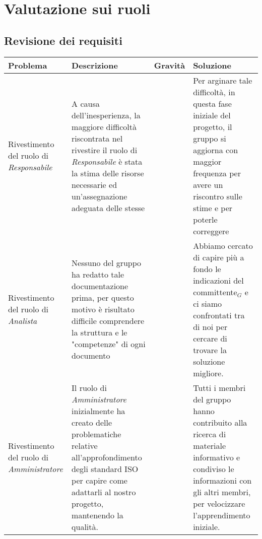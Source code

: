 {{\section{Valutazione sui ruoli}\label{ValutazionePerIlMiglioramentoValutazioneSuiRuoli}

\subsection{Revisione dei requisiti}\label{ValutazionePerIlMiglioramentoValutazioneSuiRuoliRevisioneDeiRequisiti}

\quad
\def\tabularxcolumn#1{m{#1}}
{

	\begin{center}
		\renewcommand{\arraystretch}{1.4}
		\begin{tabularx}{\textwidth}[c]{|p{}|p{5cm}|p{}|p{}|}
			\hline
			\rowcolor{airforceblue}
			\textbf{Problema} & \textbf{Descrizione} & \textbf{Gravità} & \textbf{Soluzione}\\
			\hline
			Rivestimento del ruolo di \textit{Responsabile} &A causa dell'inesperienza, la maggiore difficoltà riscontrata nel rivestire il ruolo di \textit{Responsabile} è stata la stima delle risorse necessarie ed un'assegnazione adeguata delle stesse & \centering2 & Per arginare tale difficoltà,  in questa fase iniziale del progetto, il gruppo si aggiorna con maggior frequenza per avere un riscontro sulle stime e per poterle correggere \\
			\hline
			Rivestimento del ruolo di \textit{Analista}& Nessuno del gruppo ha redatto tale documentazione prima, per questo motivo è risultato difficile comprendere la struttura e le "competenze" di ogni documento & \centering2 & Abbiamo cercato di capire più a fondo le indicazioni del committente$_G$ e ci siamo confrontati tra di noi per cercare di trovare la soluzione migliore. \\
			\hline
			Rivestimento del ruolo di \textit{Amministratore} & Il ruolo di \textit{Amministratore} inizialmente ha creato delle problematiche relative all'approfondimento degli standard ISO per capire come adattarli al nostro progetto, mantenendo la qualità. & \centering2 & Tutti i membri del gruppo hanno contribuito alla ricerca di materiale informativo e condiviso le informazioni con gli altri membri, per velocizzare l'apprendimento iniziale. \\
			\hline
		\end{tabularx}
	\end{center}

}}}
